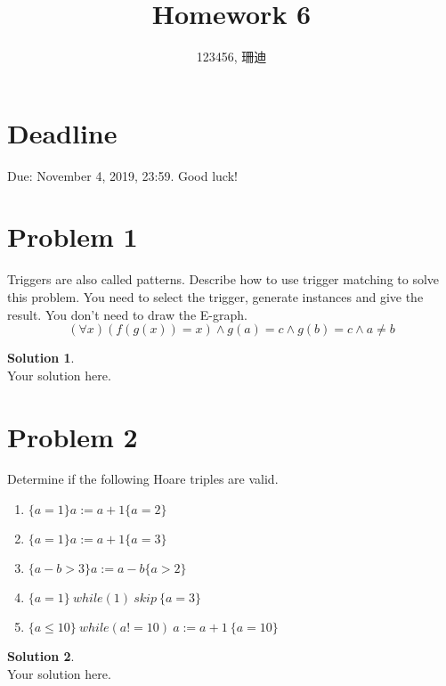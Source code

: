 \documentclass[a4paper,UTF8]{article}
\theoremstyle{definition}
\newtheorem*{solution}{Solution}
\begin{document}
\title{Homework 6}
\author{123456, 珊迪}
\maketitle

\section*{Deadline}
Due: November 4, 2019, 23:59. Good luck!

\section*{Problem 1}
Triggers are also called patterns. Describe how to use trigger matching to solve this problem. You need to select the trigger, generate instances and give the result. You don't need to draw the E-graph.
\[
(\forall x)( f(g(x))=x )\wedge g(a)=c\wedge g(b)=c\wedge a\neq b
\]
\begin{solution}
~\\
Your solution here.
\end{solution}

\section*{Problem 2}
Determine if the following Hoare triples are valid.
\begin{enumerate}
\item $ \{a=1\} a:=a+1 \{a=2\} $
\item $ \{a=1\} a:=a+1 \{a=3\} $
\item $ \{a-b>3 \}a:=a-b\{a>2\} $
\item $ \{a=1\}~while(1)~skip~\{a=3\} $
\item $ \{a\leq 10\}~while(a!=10)~a:=a+1~\{a=10\} $
\end{enumerate}
\begin{solution}
~\\
Your solution here.
\end{solution}
\end{document}
